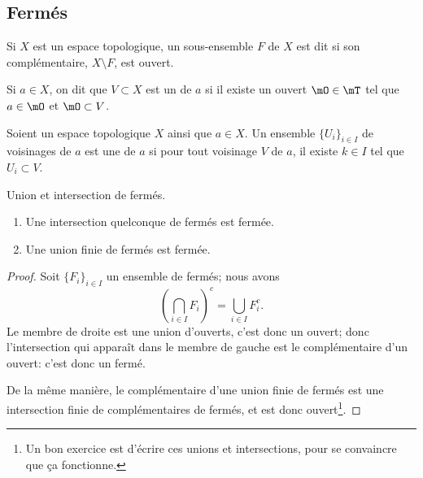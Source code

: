 \subsection{Fermés}

\begin{definition}	\label{DEFFermeooNSAAooHxZbAo}
    Si \(X \) est un espace topologique, un sous-ensemble \( F \) de \( X \) est dit  si son complémentaire, \( X\setminus F \), est ouvert.
\end{definition}

\begin{definition}		\label{DEFVoisinageooGHZCooLRcpXY}
    Si \(a \in X\), on dit que \(V \subset X\) est un  de \(a\) si il existe un ouvert \(\mO \in \mT\) tel que \(a \in \mO\) et \(\mO \subset V\).
\end{definition}

\begin{definition}       \label{DEFooBWZIooXotZLA}
    Soient un espace topologique \( X\) ainsi que \( a\in X\). Un ensemble \( \{ U_i \}_{i\in I}\) de voisinages de \( a\) est une  de \( a\) si pour tout voisinage \( V\) de \( a\), il existe \( k\in I\) tel que \( U_i\subset V\).
\end{definition}

\begin{lemma}   \label{LemQYUJwPC}
    Union et intersection de fermés.
    \begin{enumerate}
        \item       \label{ITEMooBHIGooMvkUtX}
            Une intersection quelconque de fermés est fermée.
        \item       \label{ItemKJYVooMBmMbG}
            Une union finie de fermés est fermée.
    \end{enumerate}
\end{lemma}

\begin{proof}
    Soit \( \{ F_i \}_{i\in I} \) un ensemble de fermés; nous avons
    \begin{equation}
        \left( \bigcap_{i\in I}F_i \right)^c=\bigcup_{i\in I}F_i^c.
    \end{equation}
    Le membre de droite est une union d'ouverts, c'est donc un ouvert; donc l'intersection qui apparaît dans le membre de gauche est le complémentaire d'un ouvert: c'est donc un fermé.

    De la même manière, le complémentaire d'une union finie de fermés est une intersection finie de complémentaires de fermés, et est donc ouvert\footnote{Un bon exercice est d'écrire ces unions et intersections, pour se convaincre que ça fonctionne.}.
\end{proof}


